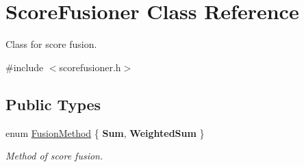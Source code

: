 \hypertarget{class_score_fusioner}{\section{Score\+Fusioner Class Reference}
\label{class_score_fusioner}
}


Class for score fusion.  




{\ttfamily \#include $<$scorefusioner.\+h$>$}

\subsection*{Public Types}
\begin{DoxyCompactItemize}
\item 
\hypertarget{class_score_fusioner_a000eb98fb47d65c0fd37335d70efe2af}{enum \hyperlink{class_score_fusioner_a000eb98fb47d65c0fd37335d70efe2af}{Fusion\+Method} \{ {\bfseries Sum}, 
{\bfseries Weighted\+Sum}
 \}}\label{class_score_fusioner_a000eb98fb47d65c0fd37335d70efe2af}

\begin{DoxyCompactList}\small\item\em Method of score fusion. \end{DoxyCompactList}\end{DoxyCompactItemize}
